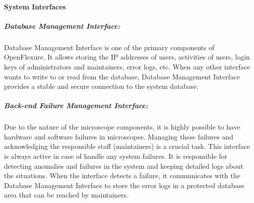 \paragraph{System Interfaces} 
\subparagraph{Database Management Interface: } Database Management Interface is one of the primary components of OpenFlexure. It allows storing the IP addresses of users, activities of users, login keys of administrators and maintainers, error logs, etc. When any other interface wants to write to or read from the database, Database Management Interface provides a stable and secure connection to the system database.
\subparagraph{Back-end Failure Management Interface: } Due to the nature of the microscope components, it is highly possible to have hardware and software failures in microscopes. Managing these failures and acknowledging the responsible staff (maintainers) is a crucial task. This interface is always active in case of handle any system failures. It is responsible for detecting anomalies and failures in the system and keeping detailed logs about the situations. When the interface detects a failure, it communicates with the Database Management Interface to store the error logs in a protected database area that can be reached by maintainers.


